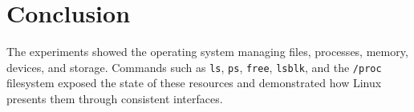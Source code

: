 \documentclass[12pt,a4paper]{article}
\begin{document}
\section{Conclusion}
The experiments showed the operating system managing files, processes, memory, devices, and storage. Commands such as \texttt{ls}, \texttt{ps}, \texttt{free}, \texttt{lsblk}, and the \texttt{/proc} filesystem exposed the state of these resources and demonstrated how Linux presents them through consistent interfaces.
\end{document}
